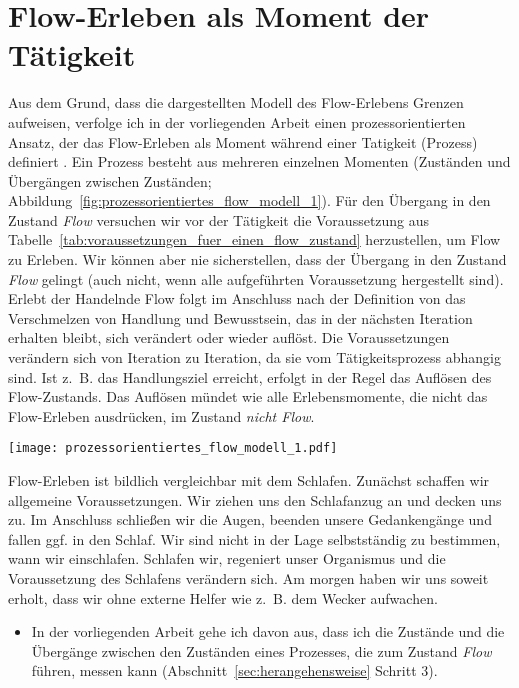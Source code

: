 

\section{Flow-Erleben als Moment der Tätigkeit} 

\label{sec:flow_erleben_als_moment_der_tatigkeit}

Aus dem Grund, dass die dargestellten Modell des Flow-Erlebens Grenzen aufweisen, verfolge ich in der vorliegenden Arbeit einen prozessorientierten Ansatz, der das Flow-Erleben als Moment während einer Tatigkeit (Prozess) definiert \citep[][S.~2]{Grueter2006}. Ein Prozess besteht aus mehreren einzelnen Momenten (Zuständen und Übergängen zwischen Zuständen; Abbildung~\ref{fig:prozessorientiertes_flow_modell_1}). Für den Übergang in den Zustand \emph{Flow} versuchen wir vor der Tätigkeit die Voraussetzung aus Tabelle~\ref{tab:voraussetzungen_fuer_einen_flow_zustand} herzustellen, um Flow zu Erleben. Wir können aber nie sicherstellen, dass der Übergang in den Zustand \emph{Flow} gelingt (auch nicht, wenn alle aufgeführten Voraussetzung hergestellt sind). Erlebt der Handelnde Flow folgt im Anschluss nach der Definition von \citet{Henk2014} das Verschmelzen von Handlung und Bewusstsein, das in der nächsten Iteration erhalten bleibt, sich verändert oder wieder auflöst. Die Voraussetzungen verändern sich von Iteration zu Iteration, da sie vom Tätigkeitsprozess abhangig sind. Ist z.~B. das Handlungsziel erreicht, erfolgt in der Regel das Auflösen des Flow-Zustands. Das Auflösen mündet wie alle Erlebensmomente, die nicht das Flow-Erleben ausdrücken, im Zustand \emph{nicht Flow}. 
\begin{sidewaysfigure}
	\texttt{[image: prozessorientiertes\_flow\_modell\_1.pdf]} \caption[Prozessorientiertes Modell des Flow-Erlebens (Einführung)]{Prozessorientiertes Modell mit Auslassungen der implizit messbaren Auswirkungen des Flow-Erlebens} \label{fig:prozessorientiertes_flow_modell_1} 
\end{sidewaysfigure}

Flow-Erleben ist bildlich vergleichbar mit dem Schlafen. Zunächst schaffen wir allgemeine Voraussetzungen. Wir ziehen uns den Schlafanzug an und decken uns zu. Im Anschluss schließen wir die Augen, beenden unsere Gedankengänge und fallen ggf. in den Schlaf. Wir sind nicht in der Lage selbstständig zu bestimmen, wann wir einschlafen. Schlafen wir, regeniert unser Organismus und die Voraussetzung des Schlafens verändern sich. Am morgen haben wir uns soweit erholt, dass wir ohne externe Helfer wie z.~B. dem Wecker aufwachen.
\begin{itemize}
	
	\item In der vorliegenden Arbeit gehe ich davon aus, dass ich die Zustände und die Übergänge zwischen den Zuständen eines Prozesses, die zum Zustand \emph{Flow} führen, messen kann (Abschnitt~\ref{sec:herangehensweise} Schritt 3).
\end{itemize}

